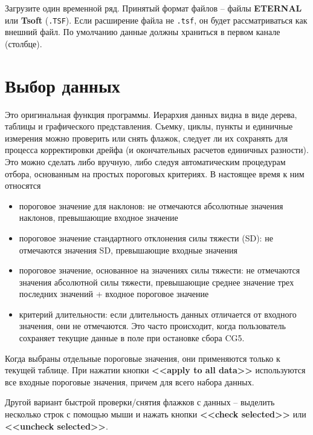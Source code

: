 Загрузите один временной ряд. Принятый формат файлов -- файлы
\textbf{\textsf{ETERNAL}} или \textbf{\textsf{Tsoft}} (\verb|.TSF|). Если
расширение файла не \verb|.tsf|, он будет рассматриваться как внешний файл. По
умолчанию данные должны храниться в первом канале (столбце).

\section[Выбор данных]{Выбор данных}
\label{sec:data_selection}

Это оригинальная функция программы. Иерархия данных видна в виде дерева, таблицы
и графического представления. Съемку, циклы, пункты и единичные измерения можно
проверить или снять флажок, следует ли их сохранять для процесса корректировки
дрейфа (и окончательных расчетов единичных разности). Это можно сделать либо
вручную, либо следуя автоматическим процедурам отбора, основанным на простых
пороговых критериях. В настоящее время к ним относятся 
\begin{itemize}
    \item пороговое значение для наклонов: не отмечаются абсолютные значения
    наклонов, превышающие входное значение
    
    \item пороговое значение стандартного отклонения силы тяжести (SD): не
    отмечаются значения SD, превышающие входные значения

    \item пороговое значение, основанное на значениях силы тяжести: не отмечаются значения
    абсолютной силы тяжести, превышающие среднее значение трех последних
    значений + входное пороговое значение

    \item критерий длительности: если длительность данных отличается от входного
    значения, они не отмечаются. Это часто происходит, когда пользователь
    сохраняет текущие данные в поле при остановке сбора CG5.

\end{itemize}

Когда выбраны отдельные пороговые значения, они применяются только к текущей
таблице. При нажатии кнопки \textbf{<<apply to all data>>} используются все
входные пороговые значения, причем для всего набора данных.

Другой вариант быстрой проверки/снятия флажков с данных -- выделить несколько
строк с помощью мыши и нажать кнопки \textbf{<<check selected>>} или
\textbf{<<uncheck selected>>}.

